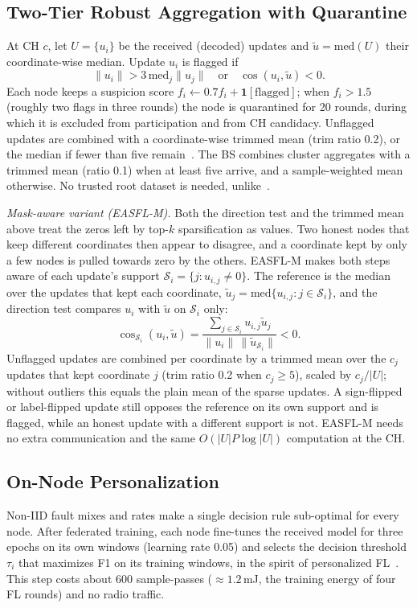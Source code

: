 \documentclass[journal]{IEEEtran}
\begin{document}
\subsection{Two-Tier Robust Aggregation with Quarantine}
At CH $c$, let $U=\{u_i\}$ be the received (decoded) updates and $\tilde u=\mathrm{med}(U)$ their coordinate-wise median. Update $u_i$ is flagged if
\begin{equation}
\|u_i\|>3\,\mathrm{med}_j\|u_j\|\quad\text{or}\quad\cos(u_i,\tilde u)<0 .
\end{equation}
Each node keeps a suspicion score $f_i\leftarrow0.7f_i+\mathbf{1}[\text{flagged}]$; when $f_i>1.5$ (roughly two flags in three rounds) the node is quarantined for 20 rounds, during which it is excluded from participation and from CH candidacy. Unflagged updates are combined with a coordinate-wise trimmed mean (trim ratio 0.2), or the median if fewer than five remain~\cite{yin2018}. The BS combines cluster aggregates with a trimmed mean (ratio 0.1) when at least five arrive, and a sample-weighted mean otherwise. No trusted root dataset is needed, unlike~\cite{cao2021}.

\textit{Mask-aware variant (EASFL-M).} Both the direction test and the trimmed mean above treat the zeros left by top-$k$ sparsification as values. Two honest nodes that keep different coordinates then appear to disagree, and a coordinate kept by only a few nodes is pulled towards zero by the others. EASFL-M makes both steps aware of each update's support $\mathcal{S}_i=\{j: u_{i,j}\neq0\}$. The reference is the median over the updates that kept each coordinate, $\tilde u_j=\mathrm{med}\{u_{i,j}: j\in\mathcal{S}_i\}$, and the direction test compares $u_i$ with $\tilde u$ on $\mathcal{S}_i$ only:
\begin{equation}
\cos_{\mathcal{S}_i}(u_i,\tilde u)=\frac{\sum_{j\in\mathcal{S}_i}u_{i,j}\tilde u_j}{\|u_i\|\,\|\tilde u_{\mathcal{S}_i}\|}<0 .
\end{equation}
Unflagged updates are combined per coordinate by a trimmed mean over the $c_j$ updates that kept coordinate $j$ (trim ratio 0.2 when $c_j\ge5$), scaled by $c_j/|U|$; without outliers this equals the plain mean of the sparse updates. A sign-flipped or label-flipped update still opposes the reference on its own support and is flagged, while an honest update with a different support is not. EASFL-M needs no extra communication and the same $O(|U|P\log|U|)$ computation at the CH.

\subsection{On-Node Personalization}
Non-IID fault mixes and rates make a single decision rule sub-optimal for every node. After federated training, each node fine-tunes the received model for three epochs on its own windows (learning rate 0.05) and selects the decision threshold $\tau_i$ that maximizes F1 on its training windows, in the spirit of personalized FL~\cite{arivazhagan2019,tan2023}. This step costs about 600 sample-passes ($\approx1.2$\,mJ, the training energy of four FL rounds) and no radio traffic.
\end{document}
